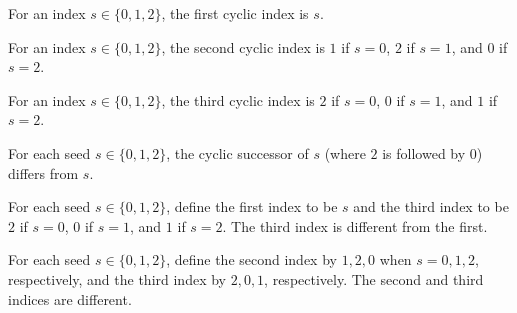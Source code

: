 \begin{definition}
\label{FABL.majorityThreeCyclicFirst}
\leanok
For an index $s\in\{0,1,2\}$, the first cyclic index is $s$.
\end{definition}

\begin{definition}
\label{FABL.majorityThreeCyclicSecond}
\leanok
For an index $s\in\{0,1,2\}$, the second cyclic index is $1$ if $s=0$, $2$ if $s=1$, and
$0$ if $s=2$.
\end{definition}

\begin{definition}
\label{FABL.majorityThreeCyclicThird}
\leanok
For an index $s\in\{0,1,2\}$, the third cyclic index is $2$ if $s=0$, $0$ if $s=1$, and
$1$ if $s=2$.
\end{definition}

\begin{theorem}
\label{FABL.majorityThreeCyclicSecond_ne_first}
\leanok
{}
For each seed $s\in\{0,1,2\}$, the cyclic successor of $s$ (where $2$ is followed by
$0$) differs from $s$.
\end{theorem}

\begin{theorem}
\label{FABL.majorityThreeCyclicThird_ne_first}
\leanok
{}
For each seed $s\in\{0,1,2\}$, define the first index to be $s$ and the third index to
be $2$ if $s=0$, $0$ if $s=1$, and $1$ if $s=2$. The third index is different from the
first.
\end{theorem}

\begin{theorem}
\label{FABL.majorityThreeCyclicThird_ne_second}
\leanok
{}
For each seed $s \in \{0,1,2\}$, define the second index by $1,2,0$ when $s=0,1,2$,
respectively, and the third index by $2,0,1$, respectively. The second and third indices
are different.
\end{theorem}

